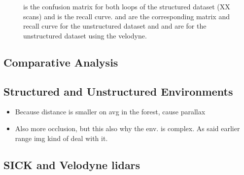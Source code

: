 \begin{figure}[H]

    \caption[todo]{\protect{} is the confusion matrix for both loops of the structured dataset (XX scans) and \protect{} is the recall curve. \protect{} and \protect{} are the corresponding matrix and recall curve for the unstructured dataset and \protect{} and \protect{} are for the unstructured dataset using the velodyne.}
    \label{fig:chap_slam_results}
\end{figure}



\subsection{Comparative Analysis}
\label{ssec:chap_slam_comparative_analysis}

\subsection{Structured and Unstructured Environments}
\label{ssec:chap_slam_struct_vs_forest}
\begin{itemize}
    \item Because distance is smaller on avg in the forest, cause parallax
    \item Also more occlusion, but this also why the env. is complex. As said earlier range img kind of deal with it.
\end{itemize}

\subsection{SICK and Velodyne \gls*{lidar}s}
\label{ssec:chap_slam_sick_vs_velodyne}

